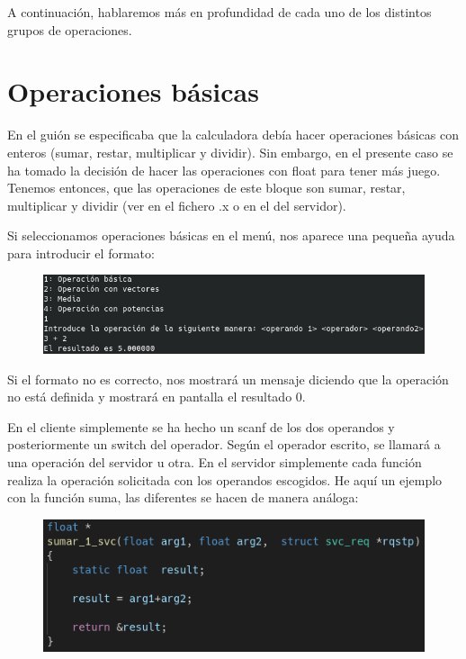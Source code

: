 \documentclass{article}
\begin{document}
	A continuación, hablaremos más en profundidad de cada uno de los distintos grupos de operaciones.
	\section{Operaciones básicas}
	En el guión se especificaba que la calculadora debía hacer operaciones básicas con enteros (sumar, restar, multiplicar y dividir). Sin embargo, en el presente caso se ha tomado la decisión de hacer las operaciones con float para tener más juego. Tenemos entonces, que las operaciones de este bloque son sumar, restar, multiplicar y dividir (ver en el fichero .x o en el del servidor).
	
	Si seleccionamos operaciones básicas en el menú, nos aparece una pequeña ayuda para introducir el formato:
	
	\begin{figure}[H]
		\centering
		\includegraphics[totalheight=2.5cm]{img/3.png}
	\end{figure}
	Si el formato no es correcto, nos mostrará un mensaje diciendo que la operación no está definida y mostrará en pantalla el resultado 0.
	
	En el cliente simplemente se ha hecho un scanf de los dos operandos y posteriormente un switch del operador. Según el operador escrito, se llamará a una operación del servidor u otra. En el servidor simplemente cada función realiza la operación solicitada con los operandos escogidos. He aquí un ejemplo con la función suma, las diferentes se hacen de manera análoga:
	
	\begin{figure}[H]
		\centering
		\includegraphics[totalheight=4.2cm]{img/4.png}
	\end{figure}
\end{document}
